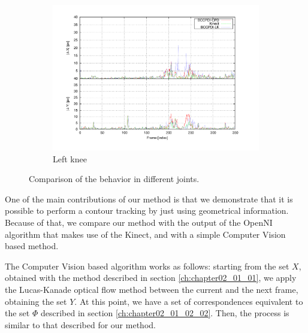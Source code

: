 \begin{figure}[t]
        \begin{subfigure}[b]{0.5\columnwidth}
                \centering
                \includegraphics[width=\textwidth, trim=50 40 80 40,clip]{fig29.pdf}
                \caption{Left knee}
                \label{fig:cp02_comparison_left_knee}
        \end{subfigure}%

        \caption{Comparison of the behavior in different joints.}\label{fig:cp02_comparison}
\end{figure}

One of the main contributions of our method is that we demonstrate that it is possible to perform a contour tracking by just using geometrical information. 
Because of that, we compare our method 
with the output of the OpenNI algorithm that makes use of the Kinect, and with a simple Computer Vision based method. 

The Computer Vision based algorithm works as follows: starting from the set $X$, obtained with the method described in 
section \ref{ch:chapter02_01_01}, we apply the Lucas-Kanade \citep{bouguet2001pyramidal} optical flow 
method between the current and the next frame, obtaining the set $Y$. At this point, we have a set of correspondences 
equivalent to the set $\Phi$ described in section \ref{ch:chapter02_01_02_02}. Then, the process is similar to 
that described for our method.

